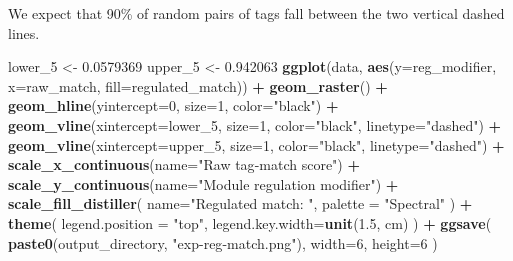 \documentclass[
]{book}
\newenvironment{Shaded}{\begin{snugshade}}{\end{snugshade}}
\newcommand{\DataTypeTok}[1]{\textcolor[rgb]{0.13,0.29,0.53}{#1}}
\newcommand{\DecValTok}[1]{\textcolor[rgb]{0.00,0.00,0.81}{#1}}
\newcommand{\FloatTok}[1]{\textcolor[rgb]{0.00,0.00,0.81}{#1}}
\newcommand{\KeywordTok}[1]{\textcolor[rgb]{0.13,0.29,0.53}{\textbf{#1}}}
\newcommand{\NormalTok}[1]{#1}
\newcommand{\OperatorTok}[1]{\textcolor[rgb]{0.81,0.36,0.00}{\textbf{#1}}}
\newcommand{\StringTok}[1]{\textcolor[rgb]{0.31,0.60,0.02}{#1}}
\begin{document}
We expect that 90\% of random pairs of tags fall between the two vertical dashed lines.

\begin{Shaded}
\begin{Highlighting}[]
\NormalTok{lower\_}\DecValTok{5}\NormalTok{ \textless{}{-}}\StringTok{ }\FloatTok{0.0579369}
\NormalTok{upper\_}\DecValTok{5}\NormalTok{ \textless{}{-}}\StringTok{ }\FloatTok{0.942063}
\KeywordTok{ggplot}\NormalTok{(data, }\KeywordTok{aes}\NormalTok{(}\DataTypeTok{y=}\NormalTok{reg\_modifier, }\DataTypeTok{x=}\NormalTok{raw\_match, }\DataTypeTok{fill=}\NormalTok{regulated\_match)) }\OperatorTok{+}
\StringTok{  }\KeywordTok{geom\_raster}\NormalTok{() }\OperatorTok{+}
\StringTok{  }\KeywordTok{geom\_hline}\NormalTok{(}\DataTypeTok{yintercept=}\DecValTok{0}\NormalTok{, }\DataTypeTok{size=}\DecValTok{1}\NormalTok{, }\DataTypeTok{color=}\StringTok{"black"}\NormalTok{) }\OperatorTok{+}
\StringTok{  }\KeywordTok{geom\_vline}\NormalTok{(}\DataTypeTok{xintercept=}\NormalTok{lower\_}\DecValTok{5}\NormalTok{, }\DataTypeTok{size=}\DecValTok{1}\NormalTok{, }\DataTypeTok{color=}\StringTok{"black"}\NormalTok{, }\DataTypeTok{linetype=}\StringTok{"dashed"}\NormalTok{) }\OperatorTok{+}
\StringTok{  }\KeywordTok{geom\_vline}\NormalTok{(}\DataTypeTok{xintercept=}\NormalTok{upper\_}\DecValTok{5}\NormalTok{, }\DataTypeTok{size=}\DecValTok{1}\NormalTok{, }\DataTypeTok{color=}\StringTok{"black"}\NormalTok{, }\DataTypeTok{linetype=}\StringTok{"dashed"}\NormalTok{) }\OperatorTok{+}
\StringTok{  }\KeywordTok{scale\_x\_continuous}\NormalTok{(}\DataTypeTok{name=}\StringTok{"Raw tag{-}match score"}\NormalTok{) }\OperatorTok{+}
\StringTok{  }\KeywordTok{scale\_y\_continuous}\NormalTok{(}\DataTypeTok{name=}\StringTok{"Module regulation modifier"}\NormalTok{) }\OperatorTok{+}
\StringTok{  }\KeywordTok{scale\_fill\_distiller}\NormalTok{(}
    \DataTypeTok{name=}\StringTok{"Regulated match:  "}\NormalTok{,}
    \DataTypeTok{palette =} \StringTok{"Spectral"}
\NormalTok{  ) }\OperatorTok{+}
\StringTok{  }\KeywordTok{theme}\NormalTok{(}
    \DataTypeTok{legend.position =} \StringTok{"top"}\NormalTok{,}
    \DataTypeTok{legend.key.width=}\KeywordTok{unit}\NormalTok{(}\FloatTok{1.5}\NormalTok{, }\StringTok{\textquotesingle{}cm\textquotesingle{}}\NormalTok{)}
\NormalTok{  ) }\OperatorTok{+}
\StringTok{  }\KeywordTok{ggsave}\NormalTok{(}
    \KeywordTok{paste0}\NormalTok{(output\_directory, }\StringTok{"exp{-}reg{-}match.png"}\NormalTok{),}
    \DataTypeTok{width=}\DecValTok{6}\NormalTok{,}
    \DataTypeTok{height=}\DecValTok{6}
\NormalTok{  )}
\end{Highlighting}
\end{Shaded}
\end{document}
